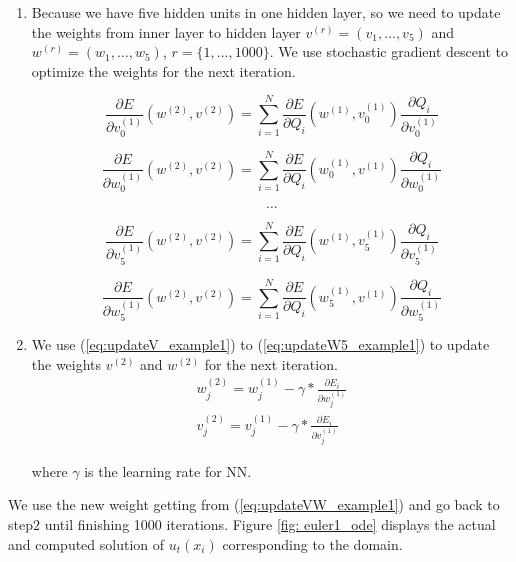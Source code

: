\documentclass{article}
\begin{document}
\begin{enumerate}
	
	\item Because we have five hidden units in one hidden layer, so we need to update the weights from inner layer to hidden layer $v^{(r)} = (v_1, \dots, v_5)$ and $w^{(r)} = (w_1, \dots, w_5)$, $r=\{1, \dots, 1000\}$. We use stochastic gradient descent to optimize the weights for the next iteration. 
	
	
	\begin{equation}
	\frac{\partial E}{\partial v_0^{(1)}}(w^{(2)},v^{(2)}) =   \sum_{i=1}^{N} \frac{\partial E}{\partial Q_{i}}(w^{(1)},v_{0}^{(1)})  \frac{\partial Q_{i}}{\partial v_{0}^{(1)}}
	\label{eq:updateV_example1}
	\end{equation}
	
	\begin{equation}
	\frac{\partial E}{\partial w_{0}^{(1)}}(w^{(2)},v^{(2)}) =  \sum_{i=1}^{N} \frac{\partial E}{\partial Q_{i}}(w_{0}^{(1)},v^{(1)}) \frac{\partial Q_{i}}{\partial w_{0}^{(1)}}
	\label{eq:updateW_example1}
	\end{equation}
	
\[\dots\]

	\begin{equation}
	\frac{\partial E}{\partial v_5^{(1)}}(w^{(2)},v^{(2)}) =   \sum_{i=1}^{N} \frac{\partial E}{\partial Q_{i}}(w^{(1)},v_{5}^{(1)})  \frac{\partial Q_{i}}{\partial v_{5}^{(1)}}
	\label{eq:updateV5_example1}
	\end{equation}
	
	\begin{equation}
	\frac{\partial E}{\partial w_{5}^{(1)}}(w^{(2)},v^{(2)}) =  \sum_{i=1}^{N} \frac{\partial E}{\partial Q_{i}}(w_{5}^{(1)},v^{(1)}) \frac{\partial Q_{i}}{\partial w_{5}^{(1)}}
	\label{eq:updateW5_example1}
	\end{equation}
	
	\item We use (\ref{eq:updateV_example1}) to (\ref{eq:updateW5_example1}) to update the weights $v^{(2)}$ and $w^{(2)}$ for the next iteration.
	\begin{equation}
	\begin{aligned}
	w_{j}^{(2)} = w_{j}^{(1)} - \gamma*\frac{\partial E_i}{\partial w_{j}^{(1)}} \\
	v_{j}^{(2)} = v_{j}^{(1)} - \gamma*\frac{\partial E_i}{\partial v_{j}^{(1)}}
	\end{aligned}
	\label{eq:updateVW_example1}
	\end{equation}
	
	where $\gamma$ is the learning rate for NN.
		
	\end{enumerate}
		\medspace \noindent
	We use the new weight getting from (\ref{eq:updateVW_example1}) and go back to step$2$ until finishing 1000 iterations. 
	Figure \ref{fig: euler1_ode} displays the actual and computed solution of $u _t(x_i)$ corresponding to the domain.
\end{document}
